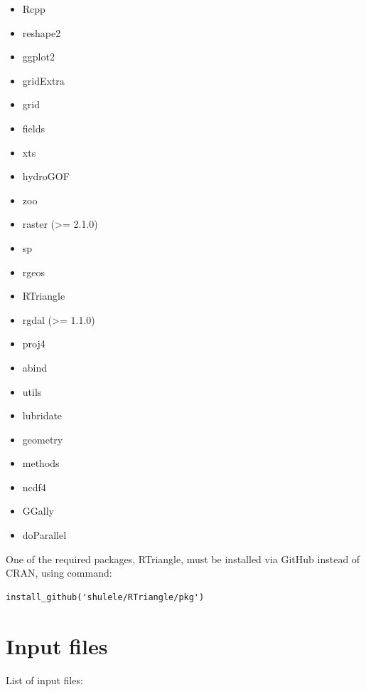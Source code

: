 \documentclass[]{scrbook}
\providecommand{\tightlist}{%
  \setlength{\itemsep}{0pt}\setlength{\parskip}{0pt}}
\begin{document}
\begin{itemize}
\tightlist
\item
  Rcpp
\item
  reshape2
\item
  ggplot2
\item
  gridExtra
\item
  grid
\item
  fields
\item
  xts
\item
  hydroGOF
\item
  zoo
\item
  raster (\textgreater{}= 2.1.0)
\item
  sp
\item
  rgeos
\item
  RTriangle
\item
  rgdal (\textgreater{}= 1.1.0)
\item
  proj4
\item
  abind
\item
  utils
\item
  lubridate
\item
  geometry
\item
  methods
\item
  ncdf4
\item
  GGally
\item
  doParallel
\end{itemize}

One of the required packages, RTriangle, must be installed via GitHub
instead of CRAN, using command:

\begin{verbatim}
install_github('shulele/RTriangle/pkg') 
\end{verbatim}

\chapter{Input files}\label{input-files}

List of input files:
\end{document}
